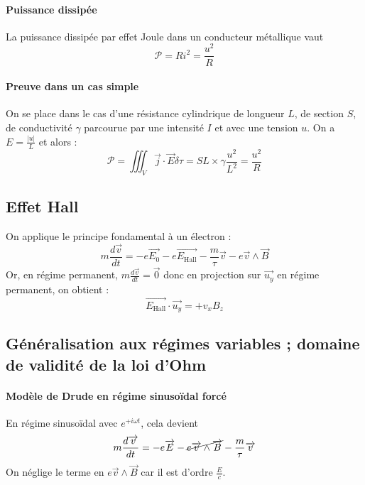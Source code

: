 \documentclass[french]{book}
\theoremstyle{plain}
\theoremstyle{definition}
\theoremstyle{remark}
\begin{document}
\paragraph{Puissance dissipée} La puissance dissipée par effet Joule dans un conducteur métallique vaut $$\mathcal{P}=Ri^2=\frac{u^2}{R}$$
\paragraph{Preuve dans un cas simple} On se place dans le cas d'une résistance cylindrique de longueur $L$, de section $S$, de conductivité $\gamma$ parcourue par une intensité $I$ et avec une tension $u$. On a $E=\displaystyle\frac{\lvert u\rvert}{L}$ et alors : $$\mathcal{P}=\iiint_V\overrightarrow{j}\cdot\overrightarrow{E}\delta\tau=SL\times\gamma\frac{u^2}{L^2}=\frac{u^2}{R}$$
\subsection{Effet Hall} On applique le principe fondamental à un électron : $$m\frac{d\overrightarrow{v}}{dt}=-e\overrightarrow{E_0}-e\overrightarrow{E_\text{Hall}}-\frac{m}{\tau}\overrightarrow{v}-e\overrightarrow{v}\wedge\overrightarrow{B}$$ Or, en régime permanent, $m\displaystyle\frac{d\overrightarrow{v}}{dt}=\overrightarrow{0}$ donc en projection sur $\overrightarrow{u_y}$ en régime permanent, on obtient : $$\overrightarrow{E_\text{Hall}}\cdot\overrightarrow{u_y}=+v_xB_z$$

\subsection{Généralisation aux régimes variables ; domaine de validité de la loi d'Ohm}

\paragraph{Modèle de Drude en régime sinusoïdal forcé} En régime sinusoïdal avec $e^{+i\omega t}$, cela devient $$m\frac{d\overrightarrow{v}}{dt}=-e\overrightarrow{E}-\cancel{e\overrightarrow{v}\wedge\overrightarrow{B}}-\frac{m}{\tau}\overrightarrow{v}$$ On néglige le terme en $e\overrightarrow{v}\wedge\overrightarrow{B}$ car il est d'ordre $\displaystyle\frac{E}{c}$.
\end{document}
